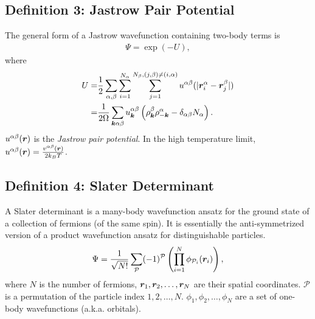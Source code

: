 \subsection{Definition 3: Jastrow Pair Potential}
The general form of a Jastrow wavefunction containing two-body terms is
\begin{align} \label{eq:wf-def-jas}
\Psi = \exp\left(-U\right),
\end{align}
where
\begin{align} \label{eq:wf-def-j2}
U =& \frac{1}{2}\sum\limits_{\alpha, \beta} \sum\limits_{i=1}^{N_\alpha} \sum\limits_{j=1}^{N_\beta, (j,\beta)\neq(i,\alpha)} 
u^{\alpha\beta}(\vert\boldsymbol{r}_i^\alpha - \boldsymbol{r}_j^\beta \vert) \nonumber \\
=& \frac{1}{2\Omega} \sum\limits_{\boldsymbol{k}\alpha\beta}
u^{\alpha\beta}_{\boldsymbol{k}} \left( \rho^\beta_{\boldsymbol{k}}\rho^\alpha_{-\boldsymbol{k}}-\delta_{\alpha\beta}N_\alpha \right).
\end{align}
$u^{\alpha\beta}(\boldsymbol{r})$ is the \emph{Jastrow pair potential}. In the high temperature limit, $u^{\alpha\beta}(\boldsymbol{r})=\frac{v^{\alpha\beta}(\boldsymbol{r})}{2k_BT}$.

\subsection{Definition 4: Slater Determinant}
A Slater determinant is a many-body wavefunction ansatz for the ground state of a collection of fermions (of the same spin). It is essentially the anti-symmetrized version of a product wavefunction ansatz for distinguishable particles.
\begin{align}
\Psi = \frac{1}{\sqrt{N!}}\sum\limits_{\mathcal{P}} (-1)^{\mathcal{P}} \left( \prod\limits_{i=1}^N \phi_{\mathcal{P}_i}(\boldsymbol{r}_i) \right),\label{eq:det}
\end{align}
where $N$ is the number of fermions, $\boldsymbol{r}_1, \boldsymbol{r}_2, \dots, \boldsymbol{r}_N$ are their spatial coordinates. $\mathcal{P}$ is a permutation of the particle index $1, 2, \dots, N$. $\phi_1, \phi_2, \dots, \phi_N$ are a set of one-body wavefunctions (a.k.a. orbitals).

